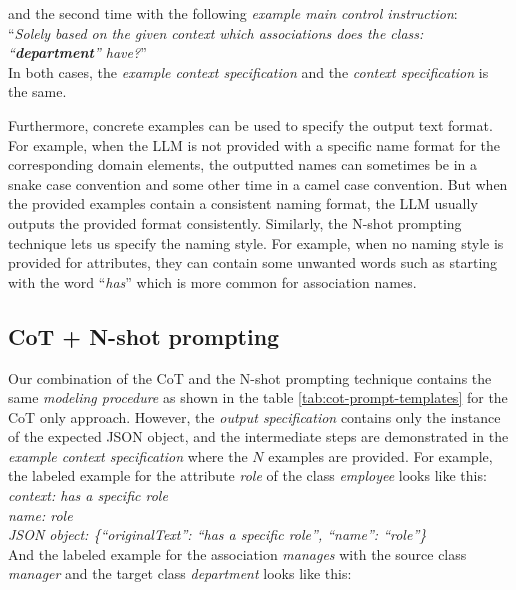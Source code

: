 \noindent{}and the second time with the following \emph{example main control instruction}: \\

\noindent{}``\textit{Solely based on the given context which associations does the class: ``\textbf{department}'' have?}'' \\

\noindent{}In both cases, the \emph{example context specification} and the \emph{context specification} is the same.

Furthermore, concrete examples can be used to specify the output text format. For example, when the LLM is not provided with a specific name format for the corresponding domain elements, the outputted names can sometimes be in a snake case convention and some other time in a camel case convention. But when the provided examples contain a consistent naming format, the LLM usually outputs the provided format consistently. Similarly, the N-shot prompting technique lets us specify the naming style. For example, when no naming style is provided for attributes, they can contain some unwanted words such as starting with the word ``\textit{has}'' which is more common for association names.


\subsection{CoT + N-shot prompting}

Our combination of the CoT and the N-shot prompting technique contains the same \emph{modeling procedure} as shown in the table \ref{tab:cot-prompt-templates} for the CoT only approach. However, the \emph{output specification} contains only the instance of the expected JSON object, and the intermediate steps are demonstrated in the \emph{example context specification} where the $N$ examples are provided. For example, the labeled example for the attribute \textit{role} of the class \textit{employee} looks like this: \\

\noindent{}\textit{context: has a specific role} \\
\textit{name: role} \\
\textit{JSON object: \{``originalText'': ``has a specific role'', ``name'': ``role''\}} \\

\noindent{}And the labeled example for the association \textit{manages} with the source class \textit{manager} and the target class \textit{department} looks like this: \\

